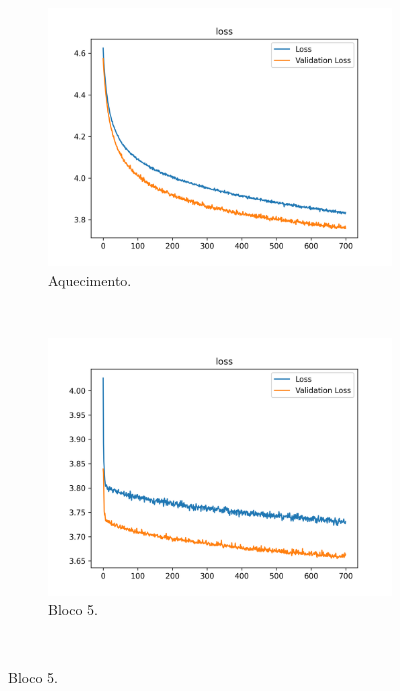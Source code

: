 \begin{figure}[H]
    \centering
    \caption{Evolução de \textit{Loss} no conjunto de dados CIFAR 100.}
    \label{results:fig:datasets:2}
     \begin{subfigure}[t]{0.45\textwidth}
         \centering
         \includegraphics[width=1\linewidth]{recursos/imagens/results/cifar_wp_loss.png}
         \caption{Aquecimento.}
         \label{results:fig:datasets:2.1}
     \end{subfigure}%
     ~ 
     \begin{subfigure}[t]{0.45\textwidth}
         \centering
         \includegraphics[width=1\linewidth]{recursos/imagens/results/cifar_loss1.png}
         \caption{Bloco 5.}
         \label{results:fig:datasets:2.2}
     \end{subfigure}%
     ~ 
     

\end{figure}
